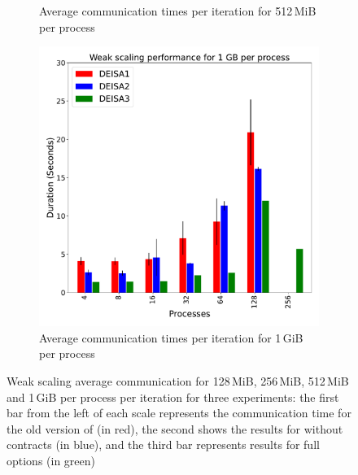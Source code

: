 \begin{figure}[h!]
\begin{subfigure}[b]{0.4\textwidth}
         \caption{Average communication times per iteration for 512\,MiB per process}
         \label{fig:X2_512}
     \end{subfigure}
     \hfill
     \begin{subfigure}[b]{0.4\textwidth}
         \centering
         \includegraphics[width=\textwidth, height=\textwidth]{figures/1GB_1vs2vs3.pdf}
         \caption{Average communication times per iteration for 1\,GiB per process}
         \label{fig:X2_1}
     \end{subfigure}
        \caption{Weak scaling average communication for 128\,MiB, 256\,MiB, 512\,MiB  and 1\,GiB per process per iteration for three experiments: the first bar from the left of each scale represents the communication time for the old version of \deisa (in red), the second shows the results for \deisa without contracts (in blue), and the third bar represents results for \deisa full options (in green)}
        \label{fig:perfX2}
\end{figure}



